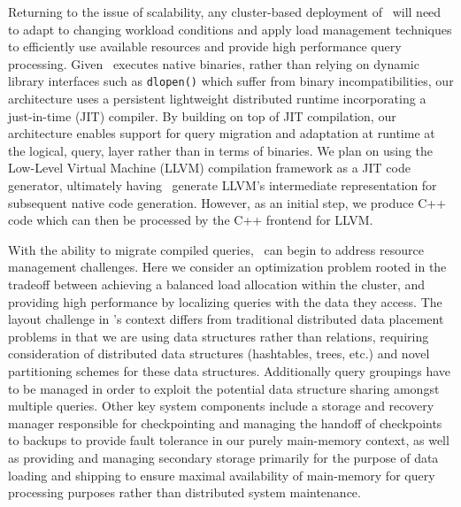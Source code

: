 Returning to the issue of scalability, any cluster-based deployment of \compiler\
will need to adapt to changing workload conditions and apply load management
techniques to efficiently use available resources and provide high performance
query processing. Given \compiler\ executes native binaries, rather than relying
on dynamic library interfaces such as \texttt{dlopen()} which suffer from binary
incompatibilities, our architecture uses a persistent lightweight distributed
runtime incorporating a just-in-time (JIT) compiler. By building on top of JIT
compilation, our architecture enables support for query migration and adaptation
at runtime at the logical, query, layer rather than in terms of binaries. We plan
on using the Low-Level Virtual Machine (LLVM) compilation framework as a JIT code
generator, ultimately having \compiler\ generate LLVM's intermediate
representation for subsequent native code generation. However, as an initial
step, we produce C++ code which can then be processed by the C++ frontend for
LLVM.

With the ability to migrate compiled queries, \compiler\ can begin to address
resource management challenges. Here we consider an optimization problem rooted
in the tradeoff between achieving a balanced load allocation within the cluster,
and providing high performance by localizing queries with the data they access.
The layout challenge in \compiler's context differs from traditional distributed
data placement problems in that we are using data structures rather than
relations, requiring consideration of distributed data structures (hashtables,
trees, etc.) and novel partitioning schemes for these data structures.
Additionally query groupings have to be managed in order to exploit the potential
data structure sharing amongst multiple queries. Other key system components
include a storage and recovery manager responsible for checkpointing and managing
the handoff of checkpoints to backups to provide fault tolerance in our purely
main-memory context, as well as providing and managing secondary storage
primarily for the purpose of data loading and shipping to ensure maximal
availability of main-memory for query processing purposes rather than
distributed system maintenance.

